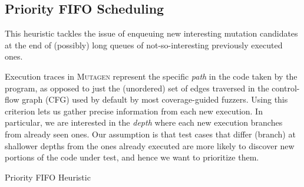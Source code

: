 \documentclass[sigconf, anonymous, review]{acmart}
\newcommand{\fuzzchick}{\textit{FuzzChick}\xspace}
\newcommand{\mutagen}{\textsc{Mutagen}\xspace}
\begin{document}
\subsection{Priority FIFO Scheduling}

This heuristic tackles the issue of enqueuing new interesting mutation
candidates at the end of (possibly) long queues of not-so-interesting previously
executed ones.

Execution traces in \mutagen represent the specific \emph{path} in the code
taken by the program, as opposed to just the (unordered) set of edges traversed
in the control-flow graph (CFG) used by default by most coverage-guided fuzzers.
%
Using this criterion lets us gather precise information from each new execution.
%
In particular, we are interested in the \emph{depth} where each new execution
branches from already seen ones.
%
Our assumption is that test cases that differ (branch) at shallower depths from
the ones already executed are more likely to discover new portions of the code
under test, and hence we want to prioritize them.

\begin{algorithm}[t]
  \SetAlgoLined
  \DontPrintSemicolon

\caption{\label{algo:mutagen:fifo}Priority FIFO Heuristic}
\end{algorithm}
\end{document}
